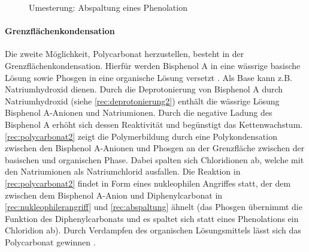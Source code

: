 {    \begin{figure}[H]
        \begin{center}
            \footnotesize
            \setatomsep{1.7em}


            \vspace{10pt}

            \chemrel{->}
            \chemnameinit{}
            \chemsign{+}

            \caption{Umesterung: Abspaltung eines Phenolation}
            \label{rec:abspaltung}
        \end{center}
    \end{figure}
}{}

\paragraph{Grenzflächenkondensation} Die zweite Möglichkeit, Polycarbonat
herzustellen, besteht in der Grenzflächenkondensation. Hierfür werden Bisphenol
A in eine wässrige basische Lösung sowie Phosgen in eine organische Lösung
versetzt \cite{cuzpe}. Als Base kann z.B. Natriumhydroxid dienen. Durch die
Deprotonierung von Bisphenol A durch Natriumhydroxid (siehe
\autoref{rec:deprotonierung2}) enthält die wässrige Lösung Bisphenol A-Anionen
und Natriumionen. Durch die negative Ladung des Bisphenol A erhöht sich dessen
Reaktivität und begünstigt das Kettenwachstum. \autoref{rec:polycarbonat2} zeigt
die Polymerbildung durch eine Polykondensation zwischen den Bisphenol A-Anionen
und Phosgen an der Grenzfläche zwischen der basischen und organischen Phase.
Dabei spalten sich Chloridionen ab, welche mit den Natriumionen als
Natriumchlorid ausfallen. Die Reaktion in \autoref{rec:polycarbonat2} findet in
Form eines nukleophilen Angriffes statt, der dem zwischen dem Bisphenol A-Anion
und Diphenylcarbonat in \autoref{rec:nukleophilerangriff} und
\autoref{rec:abspaltung} ähnelt (das Phosgen übernimmt die Funktion des
Diphenylcarbonats und es spaltet sich statt eines Phenolations ein Chloridion
ab). Durch Verdampfen des organischen Lösungsmittels lässt sich das Polycarbonat
gewinnen \cite{garoo}.

